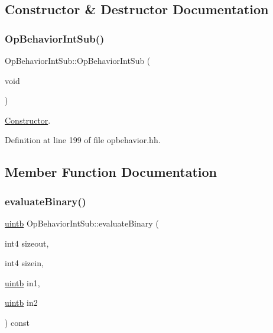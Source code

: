 \subsection{Constructor \& Destructor Documentation}
\mbox{\label{class_op_behavior_int_sub_a81e9a0003e06cd85756e6b40f625ec94}} 
\subsubsection{\texorpdfstring{OpBehaviorIntSub()}{OpBehaviorIntSub()}}
{\footnotesize\ttfamily Op\+Behavior\+Int\+Sub\+::\+Op\+Behavior\+Int\+Sub (\begin{DoxyParamCaption}\item[{void}]{ }\end{DoxyParamCaption})\hspace{0.3cm}{\ttfamily [inline]}}



\mbox{\hyperlink{class_constructor}{Constructor}}. 



Definition at line 199 of file opbehavior.\+hh.



\subsection{Member Function Documentation}
\mbox{\label{class_op_behavior_int_sub_a9bd6743b831027c8210b082d197d7baf}} 
\subsubsection{\texorpdfstring{evaluateBinary()}{evaluateBinary()}}
{\footnotesize\ttfamily \mbox{\hyperlink{types_8h_a2db313c5d32a12b01d26ac9b3bca178f}{uintb}} Op\+Behavior\+Int\+Sub\+::evaluate\+Binary (\begin{DoxyParamCaption}\item[{int4}]{sizeout,  }\item[{int4}]{sizein,  }\item[{\mbox{\hyperlink{types_8h_a2db313c5d32a12b01d26ac9b3bca178f}{uintb}}}]{in1,  }\item[{\mbox{\hyperlink{types_8h_a2db313c5d32a12b01d26ac9b3bca178f}{uintb}}}]{in2 }\end{DoxyParamCaption}) const\hspace{0.3cm}{\ttfamily [virtual]}}



